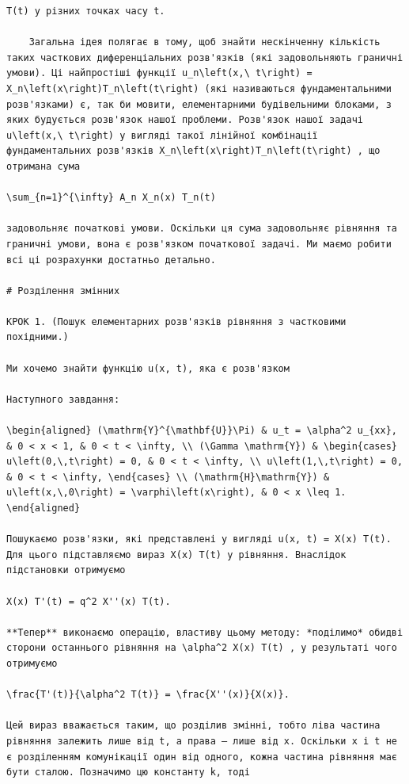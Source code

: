 \documentclass[
  ukrainian,
]{article}
\begin{document}
\begin{verbatim}
T(t) у різних точках часу t.

    Загальна ідея полягає в тому, щоб знайти нескінченну кількість таких часткових диференціальних розв'язків (які задовольняють граничні умови). Ці найпростіші функції u_n\left(x,\ t\right) = X_n\left(x\right)T_n\left(t\right) (які називаються фундаментальними розв'язками) є, так би мовити, елементарними будівельними блоками, з яких будується розв'язок нашої проблеми. Розв'язок нашої задачі u\left(x,\ t\right) у вигляді такої лінійної комбінації фундаментальних розв'язків X_n\left(x\right)T_n\left(t\right) , що отримана сума

\sum_{n=1}^{\infty} A_n X_n(x) T_n(t)

задовольняє початкові умови. Оскільки ця сума задовольняє рівняння та граничні умови, вона є розв'язком початкової задачі. Ми маємо робити всі ці розрахунки достатньо детально.

# Розділення змінних

КРОК 1. (Пошук елементарних розв'язків рівняння з частковими похідними.)

Ми хочемо знайти функцію u(x, t), яка є розв'язком

Наступного завдання:

\begin{aligned} (\mathrm{Y}^{\mathbf{U}}\Pi) & u_t = \alpha^2 u_{xx}, & 0 < x < 1, & 0 < t < \infty, \\ (\Gamma \mathrm{Y}) & \begin{cases} u\left(0,\,t\right) = 0, & 0 < t < \infty, \\ u\left(1,\,t\right) = 0, & 0 < t < \infty, \end{cases} \\ (\mathrm{H}\mathrm{Y}) & u\left(x,\,0\right) = \varphi\left(x\right), & 0 < x \leq 1. \end{aligned}

Пошукаємо розв'язки, які представлені у вигляді u(x, t) = X(x) T(t). Для цього підставляємо вираз X(x) T(t) у рівняння. Внаслідок підстановки отримуємо

X(x) T'(t) = q^2 X''(x) T(t).

**Тепер** виконаємо операцію, властиву цьому методу: *поділимо* обидві сторони останнього рівняння на \alpha^2 X(x) T(t) , у результаті чого отримуємо

\frac{T'(t)}{\alpha^2 T(t)} = \frac{X''(x)}{X(x)}.

Цей вираз вважається таким, що розділив змінні, тобто ліва частина рівняння залежить лише від t, а права — лише від x. Оскільки x і t не є розділенням комунікації один від одного, кожна частина рівняння має бути сталою. Позначимо цю константу k, тоді


\end{verbatim}
\end{document}

